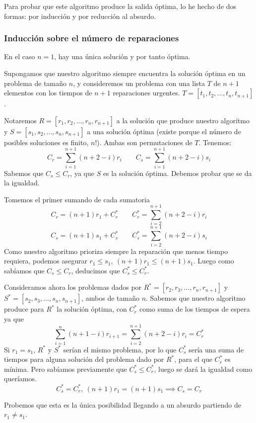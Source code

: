 \documentclass[a4]{article}
\begin{document}
Para probar que este algoritmo produce la salida óptima, lo he hecho
de dos formas: por inducción y por reducción al absurdo.

\subsubsection{Inducción sobre el número de reparaciones}

En el caso $n=1$, hay una única solución y por tanto óptima.

Supongamos que nuestro algoritmo siempre encuentra la solución óptima
en un problema de tamaño $n$, y consideremos un problema con una
lista $T$ de $n+1$ elementos con los tiempos de $n+1$ reparaciones
urgentes.  $T=[t_1,t_2,\ldots,t_n,t_{n+1}]$.

Notaremos $R=[r_1,r_2,\ldots,r_n,r_{n+1}]$ a la solución que produce
nuestro algorítmo y $S=[s_1,s_2,\ldots,s_n,s_{n+1}]$ a una solución
óptima (existe porque el número de posibles soluciones es finito,
$n!$). Ambas son permutaciones de $T$. Tenemos: \vspace{-4mm}
\[C_r = \sum_{i=1}^{n+1} (n+2-i)r_i \qquad C_s = \sum_{i=1}^{n+1} (n+2-i)s_i\]
Sabemos que $C_s \leq C_r$, ya que $S$ es la solución
óptima. Debemos probar que se da la igualdad.

Tomemos el primer sumando de cada sumatoria
\[C_r = (n+1)r_1 + C_r^* \qquad C_r^* = \sum_{i=2}^{n+1}(n+2-i)r_i\]
\[C_s = (n+1)s_1 + C_s^* \qquad C_s^* = \sum_{i=2}^{n+1}(n+2-i)s_i\]
Como nuestro algoritmo prioriza siempre la reparación que menos tiempo
requiera, podemos asegurar $r_1 \leq s_1, \ (n+1)r_1 \leq
(n+1)s_1$. Luego como sabíamos que $C_s \leq C_r$, deducimos que
$C_s^* \leq C_r^*$.

Consideramos ahora los problemas dados por
$R^*=[r_2,r_3,\ldots,r_n,r_{n+1}]$ y
$S^*=[s_2,s_3,\ldots,s_n,s_{n+1}]$, ambos de tamaño $n$. Sabemos que
nuestro algoritmo produce para $R^*$ la solución óptima, con $C^*_r$
como suma de los tiempos de espera ya que
\[\sum_{i=1}^n(n+1-i)r_{i+1} = \sum_{i=2}^{n+1}(n+2-i)r_i = C^*_r\]
Si $r_1=s_1$, $R^*$ y $S^*$ serían el mismo problema, por lo que
$C_s^*$ sería una suma de tiempos para alguna solución del problema
dado por $R^*$, para el que $C_r^*$ es mínima. Pero sabíamos
previamente que $C_s^* \leq C_r^*$, luego se dará la igualdad como
queríamos.
\[C_s^* = C_r^*, \ (n+1)r_1=(n+1)s_1 \implies C_s = C_r\]

Probemos que esta es la única posibilidad llegando a un absurdo
partiendo de $r_1 \neq s_1$.
\end{document}
